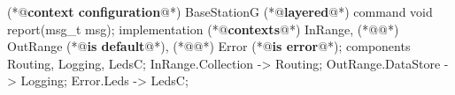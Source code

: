 \begin{Sbox}
\begin{minipage}{\columnwidth}
\begin{csource}
(*@\textbf{context configuration}@*) BaseStationG {
 (*@\textbf{layered}@*) command void report(msg_t msg);
}implementation {
 (*@\textbf{contexts}@*) InRange,
 (*@@*) OutRange (*@\textbf{is default}@*),
 (*@@*) Error (*@\textbf{is error}@*);
 components Routing, Logging, LedsC;
 InRange.Collection -> Routing;
 OutRange.DataStore -> Logging;
 Error.Leds -> LedsC;}
\end{csource}
\end{minipage}
\end{Sbox}